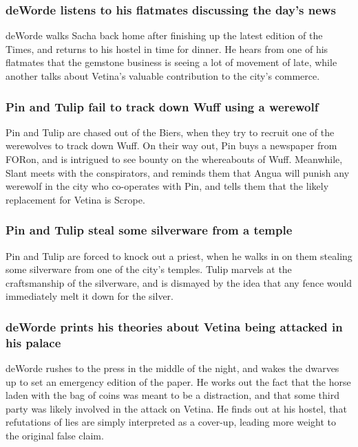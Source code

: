 \subsubsection{\Gls{deWorde} listens to his flatmates discussing the day's news}
\Gls{deWorde} walks \Gls{Sacha} back home after finishing up the latest edition of the Times, and
returns to his hostel in time for dinner. He hears from one of his flatmates that the gemstone
business is seeing a lot of movement of late, while another talks about \Gls{Vetina}'s valuable
contribution to the city's commerce.

\subsubsection{\Gls{Pin} and \Gls{Tulip} fail to track down \Gls{Wuff} using a werewolf}
\Gls{Pin} and \Gls{Tulip} are chased out of the Biers, when they try to recruit one of the
werewolves to track down \Gls{Wuff}. On their way out, \Gls{Pin} buys a newspaper from \Gls{FORon},
and is intrigued to see bounty on the whereabouts of \Gls{Wuff}. Meanwhile, \Gls{Slant} meets with
the conspirators, and reminds them that \Gls{Angua} will punish any werewolf in the city who
co-operates with \Gls{Pin}, and tells them that the likely replacement for \Gls{Vetina} is
\Gls{Scrope}.

\subsubsection{\Gls{Pin} and \Gls{Tulip} steal some silverware from a temple}
\Gls{Pin} and \Gls{Tulip} are forced to knock out a priest, when he walks in on them stealing some
silverware from one of the city's temples. \Gls{Tulip} marvels at the craftsmanship of the
silverware, and is dismayed by the idea that any fence would immediately melt it down for the
silver.

\subsubsection{\Gls{deWorde} prints his theories about \Gls{Vetina} being attacked in his palace}
\Gls{deWorde} rushes to the press in the middle of the night, and wakes the dwarves up to set an
emergency edition of the paper. He works out the fact that the horse laden with the bag of coins was
meant to be a distraction, and that some third party was likely involved in the attack on
\Gls{Vetina}. He finds out at his hostel, that refutations of lies are simply interpreted as a
cover-up, leading more weight to the original false claim.

